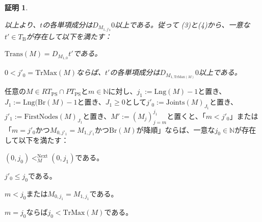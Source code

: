 \documentclass[dvipdfmx,uplatex]{jsarticle}
\theoremstyle{customnonumberbreakfortheorem}
\theoremstyle{customnonumberbreakforproof}
\newtheorem{hideableproof}{証明}
\begin{document}
\begin{hideableproof}
\begin{indented}
\begin{indented}
\begin{penumerate}
				\item[] 以上より、\(t\)の各単項成分は\(D_{M_{1,j'_0}} 0\)以上である。従って (3)と(4)から、一意な\(t' \in T_{\textrm{B}}\)が存在して以下を満たす：
				\begin{penumerate}
					\item \(\textrm{Trans}(M) = D_{M_{1,0}} t'\)である。
					\setcounter{penumerateii}{3}
					\item \(0 < j'_0 = \textrm{TrMax}(M)\)ならば、\(t'\)の各単項成分は\(D_{M_{1,\textrm{TrMax}(M)}} 0\)以上である。
				\end{penumerate}
			\end{penumerate}
		\end{indented}
	\end{indented}
\end{hideableproof}

\begin{lemma}[条件(V)の下での右端の親の基本性質]\label{条件(V)の下での右端の親の基本性質}
	任意の\(M \in RT_{\textrm{PS}} \cap PT_{\textrm{PS}}\)と\(m \in \mathbb{N}\)に対し、\(j_1 := \textrm{Lng}(M)-1\)と置き、\(J_1 := \textrm{Lng}(\textrm{Br}(M)-1\)と置き、\(J_1 \geq 0\)として\(j'_0 := \textrm{Joints}(M)_{J_1}\)と置き、\(j'_1 := \textrm{FirstNodes}(M)_{J_1}\)と置き、\(M' := (M_j)_{j=m}^{j_1}\)と置くと、「\(m < j'_0\)」または「\(m = j'_0\)かつ\(M_{0,j'_1} = M_{1,j'_1}\)かつ\(\textrm{Br}(M)\)が降順」ならば、一意な\(j_0 \in \mathbb{N}\)が存在して以下を満たす：
	\begin{penumerate}
		\item \((0,j_0) <_M^{\textrm{Next}} (0,j_1)\)である。
		\item \(j'_0 \leq j_0\)である。
		\item \(m < j_0\)または\(M_{0,j_1} = M_{1,j_1}\)である。
		\item \(m = j_0\)ならば\(j_0 < \textrm{TrMax}(M)\)である。
	\end{penumerate}
\end{lemma}
\end{document}
